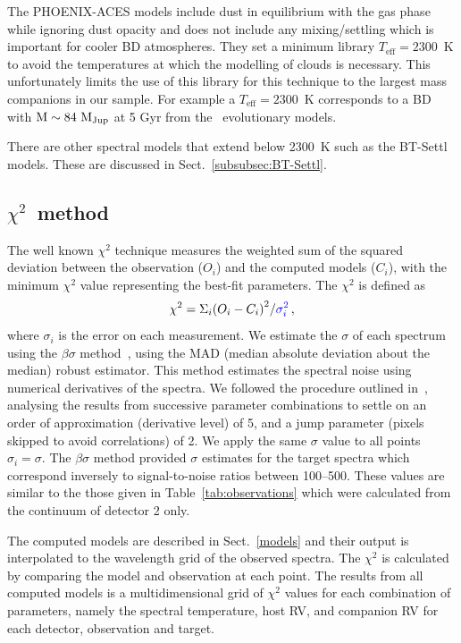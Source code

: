 \documentclass[fleqn,usenatbib]{mnras}
\newcommand*\bl{\color{blue}}
\begin{document}
The PHOENIX-ACES models include dust in equilibrium with the gas phase while ignoring dust opacity and does not include any mixing/settling which is important for cooler BD atmospheres. They set a minimum library \(T_{\textrm{eff}}=2300\)~K to avoid the temperatures at which the modelling of clouds is necessary. This unfortunately limits the use of this library for this technique to the largest mass companions in our sample. For example a \(T_{\textrm{eff}}=2300\)~K corresponds to a BD with \(\rm M\sim84~M_{Jup}\) at 5 Gyr from the~\citet{baraffe_evolutionary_2003} evolutionary models.

There are other spectral models that extend below 2300~K such as the {BT-Settl} models\citep{allard_btsettl_2013,baraffe_new_2015}. These are discussed in Sect.~\ref{subsubsec:BT-Settl}.

\subsection{\texorpdfstring{\(\chi^{2}\)}\ \ method}
\label{subsec:chi2}
The well known \(\chi^{2}\) technique measures the weighted sum of the squared deviation between the observation (\({O}_{i}\)) and the computed models (\(C_{i}\)), with the minimum \(\chi^2\) value representing the best-fit parameters. The \(\chi^{2}\) is defined as
\begin{equation}
\chi^{2} = {\Sigma}_i { (O_{i} - C_{i})}^2 / {\bl {\sigma}_{i}^{2}}\,,
\end{equation}
  where \({\sigma}_{i}\) is the error on each measurement. We estimate the \(\sigma\) of each spectrum using the \(\beta\sigma\) method~\citep{czesla_posteriori_2018}, using the MAD (median absolute deviation about the median) robust estimator. {This method estimates the spectral noise using numerical derivatives of the spectra. We followed the procedure outlined in~\citet{czesla_posteriori_2018}, analysing the results from successive parameter combinations to settle on an order of approximation (derivative level) of 5, and a jump parameter (pixels skipped to avoid correlations) of 2.} We apply the same \(\sigma\) value to all points \({\sigma}_{i} = \sigma\). The \(\beta\sigma\) method provided \(\sigma\) estimates for the target spectra which correspond inversely to signal-to-noise ratios between 100--500. These values are similar to the those given in Table~\ref{tab:observations} which were calculated from the continuum of detector 2 only.

The computed models are described in Sect.~\ref{models} and their output is interpolated to the wavelength grid of the observed spectra. The \(\chi^{2}\) is calculated by comparing the model and observation at each point. The results from all computed models is a multidimensional grid of \(\chi^2\) values for each combination of parameters, namely the spectral temperature, host RV, and companion RV for each detector, observation and target.
\end{document}
